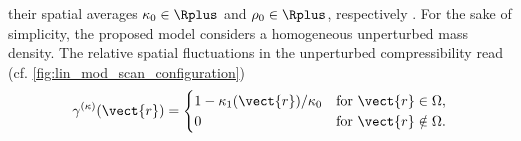 their spatial averages
$\kappa_{0} \in \Rplus$ and
$\rho_{0} \in \Rplus$,
respectively
\cite{article:NgITUFFC2006,article:JensenJASA1991,article:GorePMB1977a}.
For
the sake of
simplicity,
the proposed model considers
a homogeneous unperturbed mass density.
The relative spatial fluctuations in
the unperturbed compressibility read
(cf. \cref{fig:lin_mod_scan_configuration})
\begin{equation}
  \gamma^{(\kappa)}( \vect{r} )
  =
  \begin{cases}
    1 - \kappa_{1}( \vect{r} ) / \kappa_{0} & \text{for } \vect{r} \in \Omega,\\
    0 & \text{for } \vect{r} \notin \Omega.\\
  \end{cases}
 \label{eqn:lin_mod_mech_model_tis_simple_rel_fluctuations}
\end{equation}

